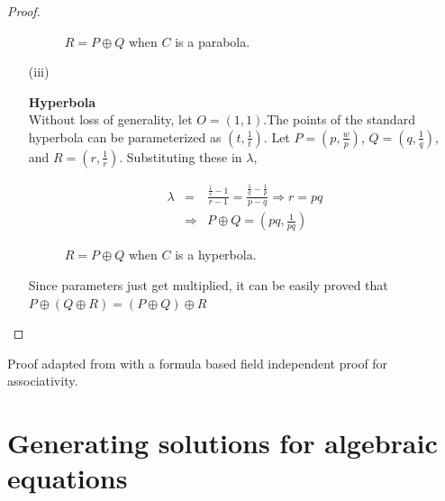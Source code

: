 \begin{proof}
\begin{itemize}
{      \begin{figure}[H]
        \center
        \caption{$R = P \oplus Q$ when $C$ is a parabola.}
      \end{figure}
      }

    \item[(iii)]{\textbf{Hyperbola}\\
        Without loss of generality, let $O=(1,1)$.The points of the standard hyperbola can
        be parameterized as $(t,\frac{1}{t})$. Let $P=(p,\frac{w}{p})$, $Q=(q,\frac{1}{q})$,
        and $R=(r,\frac{1}{r})$. Substituting these in $\lambda$,

        \begin{eqnarray*}
          \lambda&=&\frac{\frac{1}{r}-1}{r-1}=\frac{\frac{1}{q}-\frac{1}{p}}{p-q} \Rightarrow r=pq\\
          &\Rightarrow&P\oplus Q=(pq,\frac{1}{pq})
        \end{eqnarray*}

        \begin{figure}[H]
          \center
          \caption{$R = P \oplus Q$ when $C$ is a hyperbola.}
        \end{figure}

        Since parameters just get multiplied, it can be easily proved that\\
        $P\oplus(Q\oplus R)=(P\oplus Q)\oplus R$
      }
  \end{itemize}
\end{proof}
Proof adapted from \cite{shirali} with a formula based field independent proof for associativity.

\section{Generating solutions for algebraic equations}
